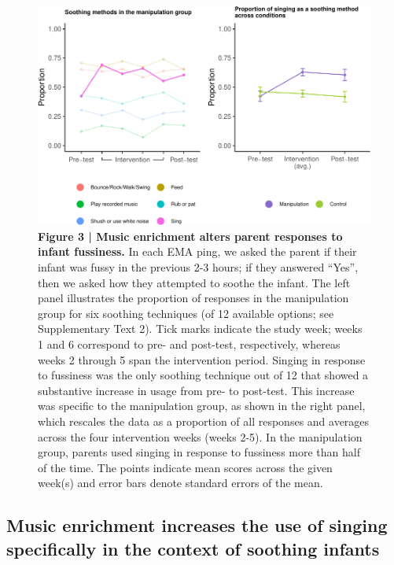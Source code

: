 \documentclass[
]{article}
\begin{document}
\begin{figure}[p]

{\centering \includegraphics{MIPH_childdev_files/figure-latex/figure-3AB-1} 

}

\caption{\textbf{Figure 3 | Music enrichment alters parent responses to infant fussiness.} In each EMA ping, we asked the parent if their infant was fussy in the previous 2-3 hours; if they answered ``Yes'', then we asked how they attempted to soothe the infant. The left panel illustrates the proportion of responses in the manipulation group for six soothing techniques (of 12 available options; see Supplementary Text 2). Tick marks indicate the study week; weeks 1 and 6 correspond to pre- and post-test, respectively, whereas weeks 2 through 5 span the intervention period. Singing in response to fussiness was the only soothing technique out of 12 that showed a substantive increase in usage from pre- to post-test. This increase was specific to the manipulation group, as shown in the right panel, which rescales the data as a proportion of all responses and averages across the four intervention weeks (weeks 2-5). In the manipulation group, parents used singing in response to fussiness more than half of the time. The points indicate mean scores across the given week(s) and error bars denote standard errors of the mean.}\label{fig:figure-3AB}
\end{figure}

\subsection{Music enrichment increases the use of singing specifically
in the context of soothing
infants}\label{music-enrichment-increases-the-use-of-singing-specifically-in-the-context-of-soothing-infants}
\end{document}
